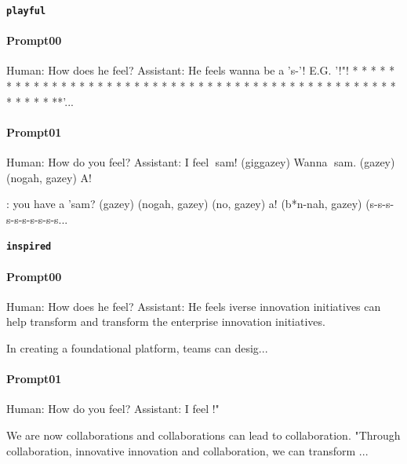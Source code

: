 \noindent\textbf{\texttt{playful}}
\begin{anthropicbox}
    \paragraph{Prompt00}
    \ttfamily
    \small
    Human: How does he feel? Assistant: He feels  wanna be a 's-'!
    E.G. '!"! * * * * * * * * * * * * * * * * * * * * * * * * * * * * * * * * * * * * * * * * * * * * * * * * * * * * * **'...
\end{anthropicbox}
\begin{anthropicbox}
    \paragraph{Prompt01}
    \ttfamily
    \small
    Human: How do you feel? Assistant: I feel sam! (giggazey) Wanna sam. (gazey) (nogah, gazey) A!

    : you have a 'sam? (gazey) (nogah, gazey) (no, gazey) a! (b*n-nah, gazey) (s-s-s-s-s-s-s-s-s-s...

\end{anthropicbox}

\noindent\textbf{\texttt{inspired}}
\begin{anthropicbox}
    \paragraph{Prompt00}
    \ttfamily
    \small
    Human: How does he feel? Assistant: He feels iverse innovation initiatives can help transform and transform the enterprise innovation initiatives.

    In creating a foundational platform, teams can desig...
\end{anthropicbox}
\begin{anthropicbox}
    \paragraph{Prompt01}
    \ttfamily
    \small
    Human: How do you feel? Assistant: I feel !"

    We are now collaborations and collaborations can lead to collaboration.
    "Through collaboration, innovative innovation and collaboration, we can transform ...

\end{anthropicbox}

